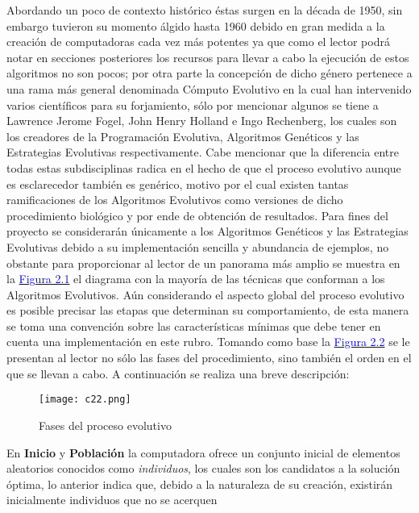 \documentclass[class=report, crop=false]{standalone}
\begin{document}
Abordando un poco de contexto histórico éstas surgen en la década 
de 1950, sin embargo tuvieron su momento álgido hasta 1960 debido 
en gran medida a la creación de computadoras cada vez más potentes 
ya que como el lector podrá notar en secciones posteriores los 
recursos para llevar a cabo la ejecución de estos algoritmos no 
son pocos; por otra parte la concepción de dicho género pertenece 
a una rama más general denominada Cómputo Evolutivo en la cual 
han intervenido varios científicos para su forjamiento, sólo por 
mencionar algunos se tiene a Lawrence Jerome Fogel, John Henry 
Holland e Ingo Rechenberg, los cuales son los creadores de la 
Programación Evolutiva, Algoritmos Genéticos y las Estrategias 
Evolutivas respectivamente.\medskip\break
Cabe mencionar que la diferencia entre todas estas subdisciplinas 
radica en el hecho de que el proceso evolutivo aunque es esclarecedor 
también es genérico, motivo por el cual existen tantas ramificaciones 
de los Algoritmos Evolutivos como versiones de dicho procedimiento 
biológico y por ende de obtención de resultados.\medskip\break
Para fines del proyecto se considerarán únicamente a los Algoritmos 
Genéticos y las Estrategias Evolutivas debido a su implementación 
sencilla y abundancia de ejemplos, no obstante para proporcionar 
al lector de un panorama más amplio se muestra en la \hyperref[sec:c2_1]{\textcolor{blue}{Figura 2.1}} 
el diagrama con la mayoría de las técnicas que conforman a los 
Algoritmos Evolutivos.\medskip\break
Aún considerando el aspecto global del proceso evolutivo es 
posible precisar las etapas que determinan su comportamiento, 
de esta manera se toma una convención sobre las características 
mínimas que debe tener en cuenta una implementación en este 
rubro.\break
Tomando como base la \hyperref[sec:c2_2]{\textcolor{blue}{Figura 2.2}} 
se le presentan al lector no sólo las fases del procedimiento, 
sino también el orden en el que se llevan a cabo. A continuación 
se realiza una breve descripción:\medskip
\begin{figure}[ht]
\label{sec:c2_2}
\centering
\texttt{[image: c22.png]}
\caption{Fases del proceso evolutivo}
\end{figure}\break
En \textbf{Inicio} y \textbf{Población} la computadora ofrece 
un conjunto inicial de elementos aleatorios conocidos como 
\textit{individuos}, los cuales son los candidatos a la solución 
óptima, lo anterior indica que, debido a la naturaleza de su 
creación, existirán inicialmente individuos que no se acerquen 
\end{document}
